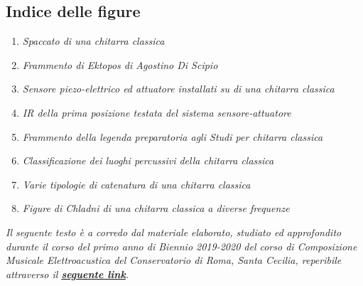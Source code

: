 \documentclass[oneside]{article}
\begin{document}
\begin{multicols*}{2}

\section{ Indice delle figure}

\begin{enumerate}
\item \emph{Spaccato di una chitarra classica}
\item \emph{Frammento di \textit{Ektopos} di Agostino Di Scipio}
\item \emph{Sensore piezo-elettrico ed attuatore installati su di una chitarra classica}
\item \emph{IR della prima posizione testata del sistema sensore-attuatore}
\item \emph{Frammento della legenda preparatoria agli Studi per chitarra classica}
\item \emph{Classificazione dei luoghi percussivi della chitarra classica}
\item \emph{Varie tipologie di \textit{catenatura} di una chitarra classica}
\item \emph{Figure di Chladni di una chitarra classica a diverse frequenze}

\end{enumerate}

\end{multicols*}

\textit{Il seguente testo è a corredo dal materiale elaborato, studiato ed approfondito durante il corso del primo anno di Biennio 2019-2020 del corso di Composizione Musicale Elettroacustica del Conservatorio di Roma, Santa Cecilia, reperibile attraverso il \textbf{\href{https://github.com/SMERM/BN-Tedesco/}{seguente link}}.}
\end{document}
